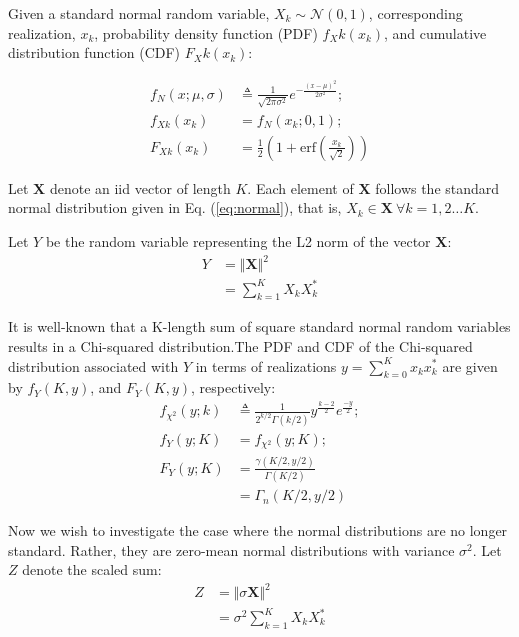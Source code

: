 
 Given a standard normal random variable, $X_k\sim\mathcal{N}(0,1)$, corresponding realization, $x_k$, probability density function (PDF) $f_Xk(x_k)$, and cumulative distribution function (CDF) $F_Xk(x_k)$:

\begin{equation}\label{eq:normal}
    \begin{aligned}
        f_N(x;\mu,\sigma) &\triangleq \frac{1}{\sqrt{2\pi\sigma^2}}e^{-\frac{(x-\mu)^2}{2\sigma^2}};\\
        f_{Xk}(x_k) &= f_N(x_k;0,1);\\
        F_{Xk}(x_k) &=\frac{1}{2}(1+\text{erf}(\frac{x_k}{\sqrt{2}}))
    \end{aligned}
\end{equation}

Let $\textbf{X}$ denote an iid vector of length $K$. Each element of $\textbf{X}$ follows the standard normal distribution given in Eq. (\ref{eq:normal}), that is, $X_k\in\textbf{X}\ \forall k = 1,2\ldots K$.

Let $Y$ be the random variable representing the L2 norm of the vector $\textbf{X}$:
\begin{equation}\label{eq:ch_sq_sum}
    \begin{aligned}
        Y &= \Vert \textbf{X} \Vert^2\\
          &= \sum_{k = 1}^K X_kX_k^*
    \end{aligned}
\end{equation}

It is well-known that a K-length sum of square standard normal random variables results in a Chi-squared distribution.The PDF and CDF of the Chi-squared distribution associated with $Y$ in terms of realizations $y = \sum_{k=0}^K x_k x_k^*$ are given by $f_Y(K,y)$, and $F_Y(K,y)$, respectively:
\begin{equation}\label{eq:ch_sq}
    \begin{aligned}
        f_{\chi^2}(y;k) &\triangleq  \frac{1}{2^{k/2}\Gamma(k/2)}y^{\frac{k-2}{2}}e^{\frac{-y}{2}};\\
        f_Y(y;K) &= f_{\chi^2}(y;K);\\
        F_Y(y;K) &= \frac{\gamma(K/2,y/2)}{\Gamma(K/2)}\\
        &= \Gamma_n(K/2,y/2)
    \end{aligned}
\end{equation}

Now we wish to investigate the case where the normal distributions are no longer standard. Rather, they are zero-mean normal distributions with variance $\sigma^2$. Let $Z$ denote the scaled sum:
\begin{equation}\label{eq:ch_sq_sum_scaled}
    \begin{aligned}
        Z &= \Vert \sigma \textbf{X} \Vert^2\\
          &= \sigma^2 \sum_{k = 1}^K X_kX_k^*
    \end{aligned}
\end{equation}

